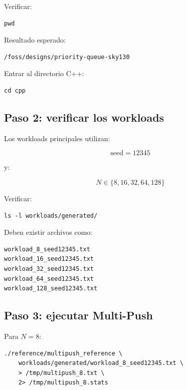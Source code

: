 \documentclass[11pt,a4paper]{article}
\begin{document}
Verificar:

\begin{lstlisting}[style=terminal]
pwd
\end{lstlisting}

Resultado esperado:

\begin{lstlisting}[style=textfile]
/foss/designs/priority-queue-sky130
\end{lstlisting}

Entrar al directorio C++:

\begin{lstlisting}[style=terminal]
cd cpp
\end{lstlisting}

\subsection{Paso 2: verificar los workloads}

Los workloads principales utilizan:

\[
\boxed{\mathrm{seed}=12345}
\]

y:

\[
\boxed{
N\in\{8,16,32,64,128\}
}
\]

Verificar:

\begin{lstlisting}[style=terminal]
ls -l workloads/generated/
\end{lstlisting}

Deben existir archivos como:

\begin{lstlisting}[style=textfile]
workload_8_seed12345.txt
workload_16_seed12345.txt
workload_32_seed12345.txt
workload_64_seed12345.txt
workload_128_seed12345.txt
\end{lstlisting}

\subsection{Paso 3: ejecutar Multi-Push}

Para $N=8$:

\begin{lstlisting}[style=terminal]
./reference/multipush_reference \
    workloads/generated/workload_8_seed12345.txt \
    > /tmp/multipush_8.txt \
    2> /tmp/multipush_8.stats
\end{lstlisting}
\end{document}
